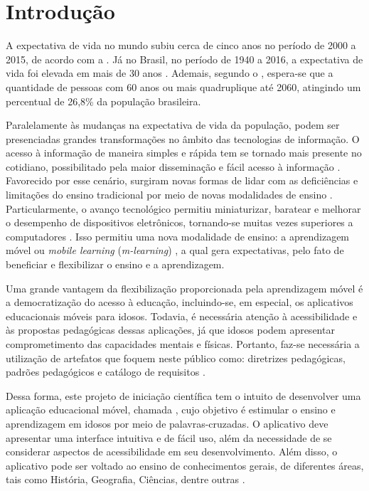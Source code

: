 \chapter{Introdução}
\label{sec:introd}
A expectativa de vida no mundo subiu cerca de cinco anos no período de 2000 a 2015, de acordo com a \cite{world2016world}. Já no Brasil, no período de 1940 a 2016, a expectativa de vida foi elevada em mais de 30 anos \citep{expectativabrasileiros}. Ademais, segundo o \cite{demografico2010disponivel}, espera-se que a quantidade de pessoas com 60 anos ou mais quadruplique até 2060, atingindo um percentual de 26,8\% da população brasileira. 

Paralelamente às mudanças na expectativa de vida da população, podem ser presenciadas grandes transformações no âmbito das tecnologias de informação. O acesso à informação de maneira simples e rápida tem se tornado mais presente no cotidiano, possibilitado pela maior disseminação e fácil acesso à informação \citep{Grossi2014}. Favorecido por esse cenário, surgiram novas formas de lidar com as deficiências e limitações do ensino tradicional por meio de novas modalidades de ensino \citep{Behrens2005}. Particularmente, o avanço tecnológico permitiu miniaturizar, baratear e melhorar o desempenho de dispositivos eletrônicos, tornando-se muitas vezes superiores a computadores \citep{Zamfirache2013}. Isso permitiu uma nova modalidade de ensino: a aprendizagem móvel ou \textit{mobile learning} (\textit{m-learning}) \citep{Crompton2013, Keegan2005, Traxler2006, Wu2012}, a qual gera expectativas, pelo fato de beneficiar e flexibilizar o ensino e a aprendizagem.

Uma grande vantagem da flexibilização proporcionada pela aprendizagem móvel é a democratização do acesso à educação, incluindo-se, em especial, os aplicativos educacionais móveis para idosos. Todavia, é necessária atenção à acessibilidade e às propostas pedagógicas dessas aplicações, já que idosos podem apresentar comprometimento das capacidades mentais e físicas. Portanto, faz-se necessária a utilização de artefatos que foquem neste público como: diretrizes pedagógicas, padrões pedagógicos e catálogo de requisitos \citep{Oliveira2019_quali}.

Dessa forma, este projeto de iniciação científica tem o intuito de desenvolver uma aplicação educacional móvel, chamada \crossword, cujo objetivo é estimular o ensino e aprendizagem em idosos por meio de palavras-cruzadas. O aplicativo deve apresentar uma interface intuitiva e de fácil uso, além da necessidade de se considerar aspectos de acessibilidade em seu desenvolvimento. Além disso, o aplicativo pode ser voltado ao ensino de conhecimentos gerais, de diferentes áreas, tais como História, Geografia, Ciências, dentre outras \citep{oliveira2018crossword}. 

